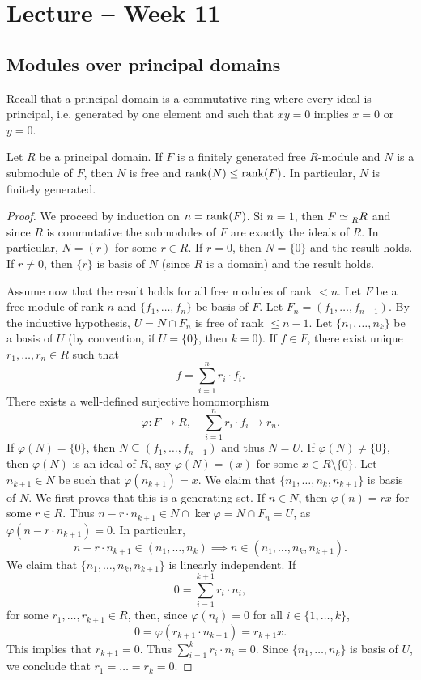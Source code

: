 \section{Lecture -- Week 11}


\subsection{Modules over principal domains}

Recall that a principal domain is a commutative ring where 
every ideal is principal, i.e. generated by one element and 
such that $xy=0$ implies $x=0$ or $y=0$. 

\begin{theorem}
\label{thm:rango}
Let $R$ be a principal domain. If $F$ is a finitely generated free $R$-module and 
$N$ is a submodule of $F$, then $N$ is free and 
$\operatorname{rank}(N)\leq\operatorname{rank}(F)$. In particular, $N$ is finitely generated. 
\end{theorem}

\begin{proof}
	We proceed by induction on $n=\operatorname{rank}(F)$. Si $n=1$, then
	$F\simeq\prescript{}{R}R$ 
	and since $R$ is commutative the submodules of $F$ are exactly the ideals of $R$. In particular,
	$N=(r)$ for some $r\in R$. If $r=0$, then $N=\{0\}$ and the result holds. If $r\ne 0$, then 
	$\{r\}$ is basis of $N$ (since $R$ is a domain) and the result holds.
	
	Assume now that the result holds for all free modules of rank $<n$. Let $F$ be a free module of
	rank $n$ and 
	$\{f_1,\dots,f_n\}$ be basis of $F$. Let $F_n=(f_1,\dots,f_{n-1})$. By the inductive hypothesis, 
	$U=N\cap F_n$ is free of rank $\leq n-1$. Let 
	$\{n_1,\dots,n_k\}$ be a basis of $U$ (by convention, if $U=\{0\}$, then $k=0$). If 
	$f\in F$, there exist unique $r_1,\dots,r_n\in R$ such that  
	\[
	f=\sum_{i=1}^n r_i\cdot f_i.
	\]
	There exists a well-defined surjective homomorphism 
	\[
	\varphi\colon F\to R,
	\quad
	\sum_{i=1}^nr_i\cdot f_i\mapsto r_n.
	\] 
	If $\varphi(N)=\{0\}$, then $N\subseteq (f_1,\dots,f_{n-1})$ and thus $N=U$. 
	If $\varphi(N)\ne\{0\}$, then $\varphi(N)$ is an ideal of 
	$R$, say $\varphi(N)=(x)$ for some $x\in R\setminus\{0\}$. Let $n_{k+1}\in N$ 
	be such that $\varphi(n_{k+1})=x$. 
    We claim that $\{n_1,\dots,n_k,n_{k+1}\}$ is basis of $N$. We first proves that 
    this is a generating set. 
	If $n\in N$, then $\varphi(n)=rx$ 
	for some $r\in R$. Thus $n-r\cdot n_{k+1}\in N\cap\ker\varphi=N\cap F_n=U$, as  
	$\varphi(n-r\cdot n_{k+1})=0$. In particular, 
	\[
	n-r\cdot n_{k+1}\in (n_1,\dots,n_k)\implies  
	n\in (n_1,\dots,n_k,n_{k+1}).
	\]
	We claim that 
	$\{n_1,\dots,n_k,n_{k+1}\}$ is linearly independent. If 
	\[
	0=\sum_{i=1}^{k+1}r_i\cdot n_i,
	\]
	for some $r_1,\dots,r_{k+1}\in R$, then, since 
	$\varphi(n_i)=0$ for all $i\in\{1,\dots,k\}$,
	\[
	0=\varphi(r_{k+1}\cdot n_{k+1})=r_{k+1}x.
	\]
	This implies that $r_{k+1}=0$. Thus $\sum_{i=1}^kr_i\cdot n_i=0$. Since
	$\{n_1,\dots,n_k\}$ is basis of $U$, we conclude that 
	$r_1=\dots=r_k=0$. 
\end{proof}

